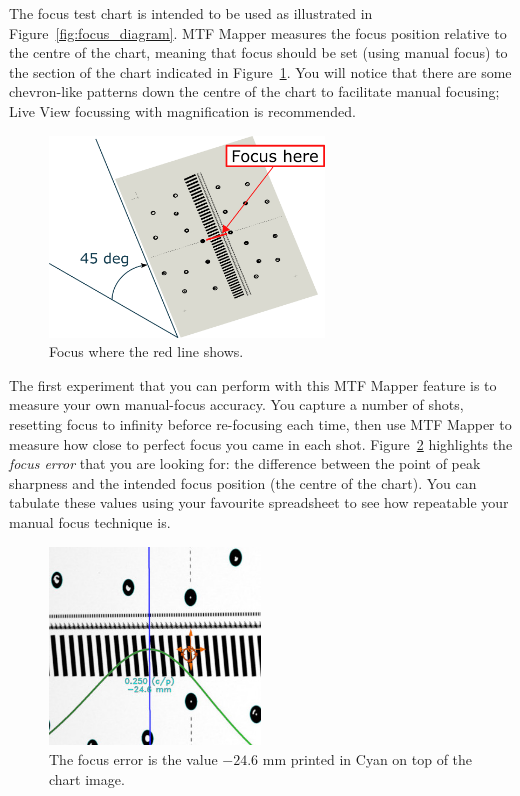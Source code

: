 \documentclass[a4paper]{article}
\begin{document}
The \textsf{focus} test chart is intended to be used as illustrated in
Figure~\ref{fig:focus_diagram}. MTF Mapper measures the focus position
relative to the centre of the chart, meaning that focus should be set (using
manual focus) to the section of the chart indicated in
Figure~\ref{fig:manual_focus_position}. You will notice that there are some
chevron-like patterns down the centre of the chart to facilitate manual
focusing; Live View focussing with magnification is recommended.

\begin{figure}
\centering
\includegraphics[width=0.65\textwidth]{figures/manual_focus_position}
\caption{Focus where the red line shows.}
\label{fig:manual_focus_position}
\end{figure}

The first experiment that you can perform with this MTF Mapper feature is to
measure your own manual-focus accuracy. You capture a number of shots,
resetting focus to infinity beforce re-focusing each time, then use MTF Mapper to measure how
close to perfect focus you came in each shot.
Figure~\ref{fig:manual_focus_reading} highlights the \emph{focus error} that you are
looking for: the difference between the point of peak sharpness and the
intended focus position (the centre of the chart). You can tabulate these
values using your favourite spreadsheet to see how repeatable your manual focus technique is.

\begin{figure}
\centering
\includegraphics[width=0.5\textwidth]{figures/manual_focus_reading}
\caption{The focus error is the value $-24.6$ mm printed in Cyan on top of
the chart image.}
\label{fig:manual_focus_reading}
\end{figure}
\end{document}
